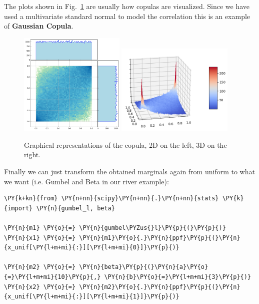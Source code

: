 The plots shown in Fig.~\ref{fig:copula} are usually how copulas are visualized. Since we have used a multivariate standard normal 
to model the correlation this is an example of \textbf{Gaussian Copula}.

\begin{figure}[htb]
\centering
\includegraphics[width=0.45\textwidth]{figures/lesson6_16_0.png}
\quad
\includegraphics[width=0.5\textwidth]{figures/copula_3d.png}
\caption{Graphical representations of the copula, 2D on the left, 3D on the right.}
\label{fig:copula}
\end{figure}

Finally we can just transform the obtained marginals again from uniform to what we want
(i.e. Gumbel and Beta in our river example):

\begin{codebox}[breakable, size=fbox, boxrule=1pt, pad at break*=1mm,colback=cellbackground, colframe=cellborder]
\begin{Verbatim}[commandchars=\\\{\}]
\PY{k+kn}{from} \PY{n+nn}{scipy}\PY{n+nn}{.}\PY{n+nn}{stats} \PY{k}{import} \PY{n}{gumbel_l, beta}

\PY{n}{m1} \PY{o}{=} \PY{n}{gumbel\PYZus{}l}\PY{p}{(}\PY{p}{)}
\PY{n}{x1} \PY{o}{=} \PY{n}{m1}\PY{o}{.}\PY{n}{ppf}\PY{p}{(}\PY{n}{x_unif[\PY{l+m+mi}{:}][\PY{l+m+mi}{0}]}\PY{p}{)}

\PY{n}{m2} \PY{o}{=} \PY{n}{beta}\PY{p}{(}\PY{n}{a}\PY{o}{=}\PY{l+m+mi}{10}\PY{p}{,} \PY{n}{b}\PY{o}{=}\PY{l+m+mi}{3}\PY{p}{)}
\PY{n}{x2} \PY{o}{=} \PY{n}{m2}\PY{o}{.}\PY{n}{ppf}\PY{p}{(}\PY{n}{x_unif[\PY{l+m+mi}{:}][\PY{l+m+mi}{1}]}\PY{p}{)}
\end{Verbatim}
\end{codebox}

